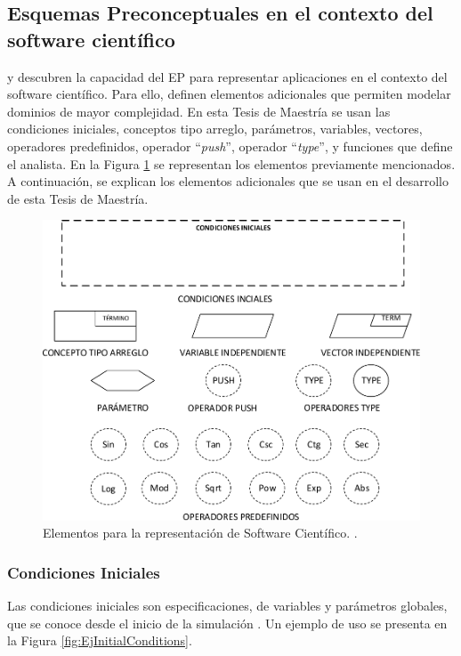 \subsection{Esquemas Preconceptuales en el contexto del software científico}\label{subsec:EPScientific}

\cite{JCalle} y \cite{norena2018det} descubren la capacidad del EP para representar aplicaciones en el contexto del software científico. Para ello, definen elementos adicionales que permiten modelar dominios de mayor complejidad. En esta Tesis de Maestría se usan las condiciones iniciales, conceptos tipo arreglo, parámetros, variables, vectores, operadores predefinidos, operador ``\textit{push}'', operador ``\textit{type}'',  y funciones que define el analista. En la Figura \ref{fig:NewElements} se representan los elementos previamente mencionados. A continuación, se explican los elementos adicionales que se usan en el desarrollo de esta Tesis de Maestría.

\begin{figure}[h]
	\centering%
	\includegraphics[width=0.9\linewidth]{Fig/NuevosElementosDelEP.pdf}%
	\caption[Elementos para la representación de Software Científico.]{Elementos para la representación de Software Científico. \citep{JCalle,norena2018det}.} \label{fig:NewElements}
\end{figure}

\subsubsection{Condiciones Iniciales}
Las condiciones iniciales son especificaciones, de variables y parámetros globales, que se conoce desde el inicio de la simulación \citep{norena2018det}. Un ejemplo de uso se presenta en la Figura \ref{fig:EjInitialConditions}.

